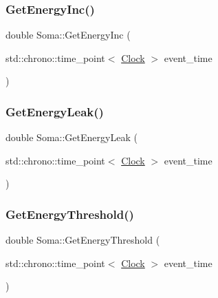 \mbox{\label{classSoma_a5d698a7ad270ad4ea63a3de5f25fa760}} 
\subsubsection{\texorpdfstring{Get\+Energy\+Inc()}{GetEnergyInc()}}
{\footnotesize\ttfamily double Soma\+::\+Get\+Energy\+Inc (\begin{DoxyParamCaption}\item[{std\+::chrono\+::time\+\_\+point$<$ \mbox{\hyperlink{universe_8h_a0ef8d951d1ca5ab3cfaf7ab4c7a6fd80}{Clock}} $>$}]{event\+\_\+time }\end{DoxyParamCaption})\hspace{0.3cm}{\ttfamily [inline]}}

\mbox{\label{classSoma_a0be69cd912f978f3ab3d94bebb9fbbaf}} 
\subsubsection{\texorpdfstring{Get\+Energy\+Leak()}{GetEnergyLeak()}}
{\footnotesize\ttfamily double Soma\+::\+Get\+Energy\+Leak (\begin{DoxyParamCaption}\item[{std\+::chrono\+::time\+\_\+point$<$ \mbox{\hyperlink{universe_8h_a0ef8d951d1ca5ab3cfaf7ab4c7a6fd80}{Clock}} $>$}]{event\+\_\+time }\end{DoxyParamCaption})\hspace{0.3cm}{\ttfamily [inline]}}

\mbox{\label{classSoma_a0b45cc454565027bb25daa1396056a7e}} 
\subsubsection{\texorpdfstring{Get\+Energy\+Threshold()}{GetEnergyThreshold()}}
{\footnotesize\ttfamily double Soma\+::\+Get\+Energy\+Threshold (\begin{DoxyParamCaption}\item[{std\+::chrono\+::time\+\_\+point$<$ \mbox{\hyperlink{universe_8h_a0ef8d951d1ca5ab3cfaf7ab4c7a6fd80}{Clock}} $>$}]{event\+\_\+time }\end{DoxyParamCaption})\hspace{0.3cm}{\ttfamily [inline]}}

